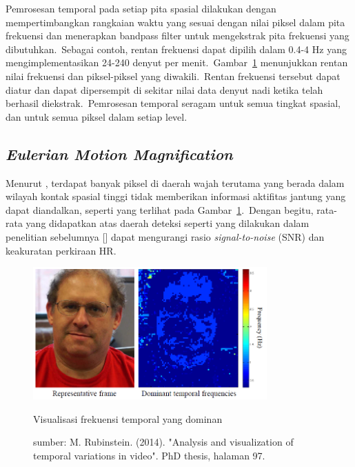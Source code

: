 Pemrosesan temporal pada setiap pita spasial dilakukan dengan mempertimbangkan rangkaian waktu yang sesuai dengan nilai piksel dalam pita frekuensi dan menerapkan bandpass filter untuk mengekstrak pita frekuensi yang dibutuhkan.~Sebagai contoh, rentan frekuensi dapat dipilih dalam 0.4-4 Hz yang mengimplementasikan 24-240 denyut per menit.~Gambar~\ref{fig:compare} menunjukkan rentan nilai frekuensi dan piksel-piksel yang diwakili.~Rentan frekuensi tersebut dapat diatur dan dapat dipersempit di sekitar nilai data denyut nadi ketika telah berhasil diekstrak.~Pemrosesan temporal seragam untuk semua tingkat spasial, dan untuk semua piksel dalam setiap level.


\subsection{\textit{Eulerian Motion Magnification}} \label{ssec:EMM}
Menurut \citet{RubinsteinPhDThesis2014}, terdapat banyak piksel di daerah wajah terutama yang berada dalam wilayah kontak spasial tinggi tidak memberikan informasi aktifitas jantung yang dapat diandalkan, seperti yang terlihat pada Gambar~\ref{fig:compare}.~Dengan begitu, rata-rata yang didapatkan atas daerah deteksi seperti yang dilakukan dalam penelitian sebelumnya [\citet{Poh2010,Poh2011}] dapat mengurangi rasio \textit{signal-to-noise} (SNR) dan keakuratan perkiraan HR.


\begin{figure}[ht]
	\vspace{0.5em}
	\centering
	\includegraphics[width=0.8\textwidth]{Compare}
	\caption{Visualisasi frekuensi temporal yang dominan}
	\caption*{sumber: M. Rubinstein. (2014). "Analysis and visualization of temporal variations in video". PhD thesis, halaman 97.}
	\label{fig:compare}   
\end{figure}

